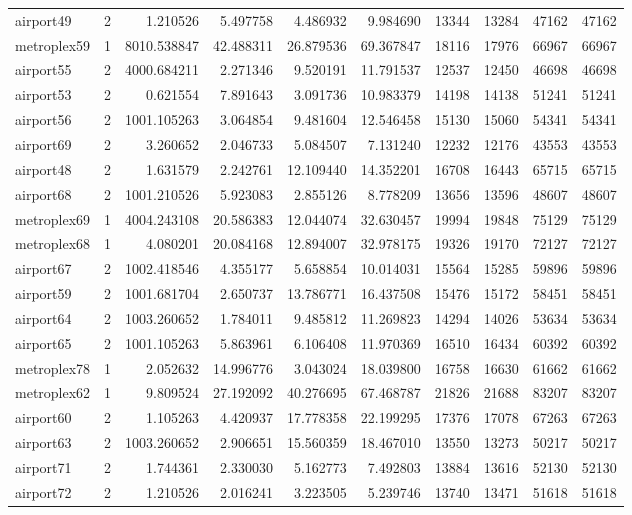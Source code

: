 \begin{longtable}{|l|r|r|r|r|r|r|r|r|r|}
airport49 & 2 & 1.210526 & 5.497758 & 4.486932 & 9.984690 & 13344 & 13284 & 47162 & 47162 \\
metroplex59 & 1 & 8010.538847 & 42.488311 & 26.879536 & 69.367847 & 18116 & 17976 & 66967 & 66967 \\
airport55 & 2 & 4000.684211 & 2.271346 & 9.520191 & 11.791537 & 12537 & 12450 & 46698 & 46698 \\
airport53 & 2 & 0.621554 & 7.891643 & 3.091736 & 10.983379 & 14198 & 14138 & 51241 & 51241 \\
airport56 & 2 & 1001.105263 & 3.064854 & 9.481604 & 12.546458 & 15130 & 15060 & 54341 & 54341 \\
airport69 & 2 & 3.260652 & 2.046733 & 5.084507 & 7.131240 & 12232 & 12176 & 43553 & 43553 \\
airport48 & 2 & 1.631579 & 2.242761 & 12.109440 & 14.352201 & 16708 & 16443 & 65715 & 65715 \\
airport68 & 2 & 1001.210526 & 5.923083 & 2.855126 & 8.778209 & 13656 & 13596 & 48607 & 48607 \\
metroplex69 & 1 & 4004.243108 & 20.586383 & 12.044074 & 32.630457 & 19994 & 19848 & 75129 & 75129 \\
metroplex68 & 1 & 4.080201 & 20.084168 & 12.894007 & 32.978175 & 19326 & 19170 & 72127 & 72127 \\
airport67 & 2 & 1002.418546 & 4.355177 & 5.658854 & 10.014031 & 15564 & 15285 & 59896 & 59896 \\
airport59 & 2 & 1001.681704 & 2.650737 & 13.786771 & 16.437508 & 15476 & 15172 & 58451 & 58451 \\
airport64 & 2 & 1003.260652 & 1.784011 & 9.485812 & 11.269823 & 14294 & 14026 & 53634 & 53634 \\
airport65 & 2 & 1001.105263 & 5.863961 & 6.106408 & 11.970369 & 16510 & 16434 & 60392 & 60392 \\
metroplex78 & 1 & 2.052632 & 14.996776 & 3.043024 & 18.039800 & 16758 & 16630 & 61662 & 61662 \\
metroplex62 & 1 & 9.809524 & 27.192092 & 40.276695 & 67.468787 & 21826 & 21688 & 83207 & 83207 \\
airport60 & 2 & 1.105263 & 4.420937 & 17.778358 & 22.199295 & 17376 & 17078 & 67263 & 67263 \\
airport63 & 2 & 1003.260652 & 2.906651 & 15.560359 & 18.467010 & 13550 & 13273 & 50217 & 50217 \\
airport71 & 2 & 1.744361 & 2.330030 & 5.162773 & 7.492803 & 13884 & 13616 & 52130 & 52130 \\
airport72 & 2 & 1.210526 & 2.016241 & 3.223505 & 5.239746 & 13740 & 13471 & 51618 & 51618 \\

\end{longtable}
